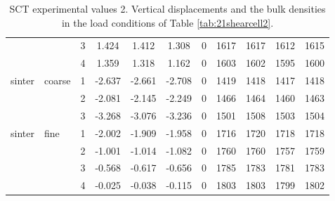 \begin{table}[h]
\begin{tabular}{ll|c|cccc|cccc}
          &       & 3     & 1.424 & 1.412 & 1.308 & 0     & 1617  & 1617  & 1612  & 1615 \\
          &       & 4     & 1.359 & 1.318 & 1.162 & 0     & 1603  & 1602  & 1595  & 1600 \\
\hline 
    sinter & coarse & 1     & -2.637 & -2.661 & -2.708 & 0     & 1419  & 1418  & 1417  & 1418 \\
          &       & 2     & -2.081 & -2.145 & -2.249 & 0     & 1466  & 1464  & 1460  & 1463 \\
          &       & 3     & -3.268 & -3.076 & -3.236 & 0     & 1501  & 1508  & 1503  & 1504 \\
\hline 
    sinter & fine  & 1     & -2.002 & -1.909 & -1.958 & 0     & 1716  & 1720  & 1718  & 1718 \\
          &       & 2     & -1.001 & -1.014 & -1.082 & 0     & 1760  & 1760  & 1757  & 1759 \\
          &       & 3     & -0.568 & -0.617 & -0.656 & 0     & 1785  & 1783  & 1781  & 1783 \\
          &       & 4     & -0.025 & -0.038 & -0.115 & 0     & 1803  & 1803  & 1799  & 1802 \\
    \hline
\end{tabular}
\caption[SCT experimental values 2]{\acs{SCT} experimental values 2. Vertical
displacements and the bulk densities in the load conditions of Table
\ref{tab:21shearcell2}.}
\label{tab:20shearcell1}
\end{table}